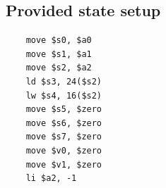 \subsection{Provided state setup}
\begin{verbatim}
    move $s0, $a0
    move $s1, $a1
    move $s2, $a2
    ld $s3, 24($s2)
    lw $s4, 16($s2)
    move $s5, $zero
    move $s6, $zero
    move $s7, $zero
    move $v0, $zero
    move $v1, $zero
    li $a2, -1
\end{verbatim}
